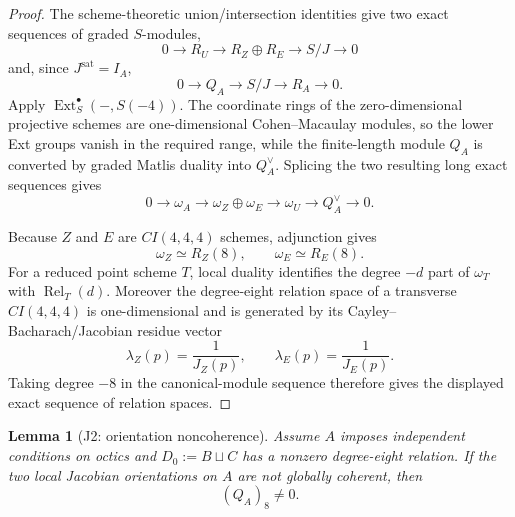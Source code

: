 \documentclass[11pt,reqno]{amsart}
\newtheorem{lemma}[theorem]{Lemma}
\theoremstyle{remark}
\newcommand{\Rel}{\operatorname{Rel}}
\begin{document}
\begin{proof}
The scheme-theoretic union/intersection identities give two exact sequences of graded $S$-modules,
\[
0\longrightarrow R_U\longrightarrow R_Z\oplus R_E
\longrightarrow S/J\longrightarrow0
\]
and, since $J^{\mathrm{sat}}=I_A$,
\[
0\longrightarrow Q_A\longrightarrow S/J\longrightarrow R_A\longrightarrow0.
\]
Apply $\operatorname{Ext}^{\bullet}_S(-,S(-4))$.  The coordinate rings of the zero-dimensional projective schemes are one-dimensional Cohen--Macaulay modules, so the lower Ext groups vanish in the required range, while the finite-length module $Q_A$ is converted by graded Matlis duality into $Q_A^\vee$.  Splicing the two resulting long exact sequences gives
\[
0\to\omega_A\to\omega_Z\oplus\omega_E\to\omega_U\to Q_A^\vee\to0.
\]

Because $Z$ and $E$ are $CI(4,4,4)$ schemes, adjunction gives
\[
\omega_Z\simeq R_Z(8),
\qquad
\omega_E\simeq R_E(8).
\]
For a reduced point scheme $T$, local duality identifies the degree $-d$ part of $\omega_T$ with $\Rel_T(d)$.  Moreover the degree-eight relation space of a transverse $CI(4,4,4)$ is one-dimensional and is generated by its Cayley--Bacharach/Jacobian residue vector
\[
\lambda_Z(p)=\frac1{J_Z(p)},
\qquad
\lambda_E(p)=\frac1{J_E(p)}.
\]
Taking degree $-8$ in the canonical-module sequence therefore gives the displayed exact sequence of relation spaces.
\end{proof}

\begin{lemma}[J2: orientation noncoherence]\label{lem:J2}
Assume $A$ imposes independent conditions on octics and $D_0:=B\sqcup C$ has a nonzero degree-eight relation.  If the two local Jacobian orientations on $A$ are not globally coherent, then
\[
(Q_A)_8\ne0.
\]
\end{lemma}
\end{document}
